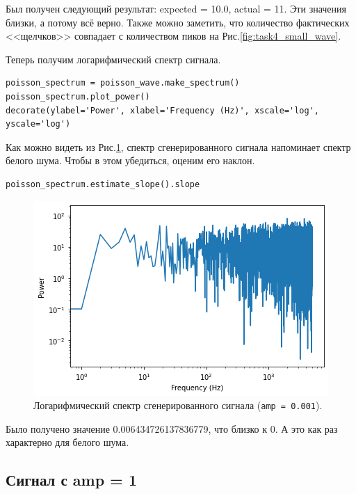 \documentclass[a4paper, 14pt]{extarticle}
\begin{document}
    Был получен следующий результат: expected = 10.0, actual = 11. Эти значения близки, а потому всё верно.
    Также можно заметить, что количество фактических <<щелчков>> совпадает с количеством пиков на Рис.\ref{fig:task4_small_wave}.

    Теперь получим логарифмический спектр сигнала.

    \begin{lstlisting}[caption= Вычисление логарифмического спектра сигнала \texttt{(amp = 0.001)}., label={lst:task4_small_spectrum_log}]
poisson_spectrum = poisson_wave.make_spectrum()
poisson_spectrum.plot_power()
decorate(ylabel='Power', xlabel='Frequency (Hz)', xscale='log', yscale='log')   \end{lstlisting}

    Как можно видеть из Рис.\ref{fig:task4_small_spectrum_log}, спектр сгенерированного сигнала напоминает спектр белого
    шума. Чтобы в этом убедиться, оценим его наклон.

    \begin{lstlisting}[caption= Вычисление наклона \texttt{(amp = 0.001)}., label={lst:task4_small_slope}]
poisson_spectrum.estimate_slope().slope \end{lstlisting}

    \begin{figure}[H]
        \centering
        \includegraphics[width=0.8\linewidth]{resources/Images/task4_small_spectrum_log}
        \caption{Логарифмический спектр сгенерированного сигнала (\texttt{amp = 0.001}).}
        \label{fig:task4_small_spectrum_log}
    \end{figure}

    Было получено значение 0.006434726137836779, что близко к 0. А это как раз характерно для белого шума.

    \newpage
    \subsection{Сигнал с amp = 1}
    \label{subsec:task4_large}
\end{document}
